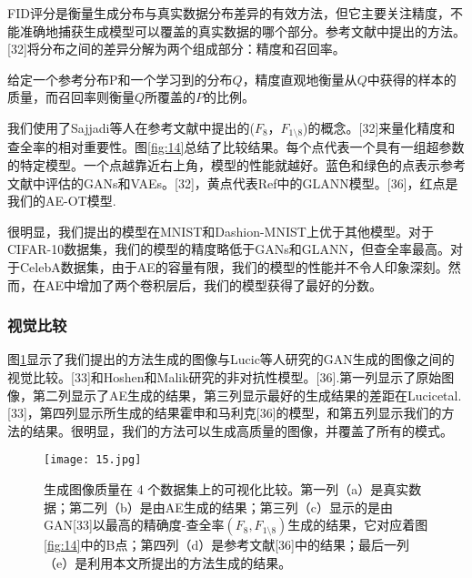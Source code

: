FID评分是衡量生成分布与真实数据分布差异的有效方法，但它主要关注精度，不能准确地捕获生成模型可以覆盖的真实数据的哪个部分。参考文献中提出的方法。[32]将分布之间的差异分解为两个组成部分：精度和召回率。

给定一个参考分布P和一个学习到的分布$Q$，精度直观地衡量从$Q$中获得的样本的质量，而召回率则衡量$Q$所覆盖的$P$的比例。

我们使用了Sajjadi等人在参考文献中提出的($F_8$，$F_{1 \setminus  8}$)的概念。[32]来量化精度和查全率的相对重要性。图\ref{fig:14}总结了比较结果。每个点代表一个具有一组超参数的特定模型。一个点越靠近右上角，模型的性能就越好。蓝色和绿色的点表示参考文献中评估的GANs和VAEs。[32]，黄点代表Ref中的GLANN模型。[36]，红点是我们的AE-OT模型.

很明显，我们提出的模型在MNIST和Dashion-MNIST上优于其他模型。对于CIFAR-10数据集，我们的模型的精度略低于GANs和GLANN，但查全率最高。对于CelebA数据集，由于AE的容量有限，我们的模型的性能并不令人印象深刻。然而，在AE中增加了两个卷积层后，我们的模型获得了最好的分数。

\subsubsection{视觉比较}

图\ref{fig:15}显示了我们提出的方法生成的图像与Lucic等人研究的GAN生成的图像之间的视觉比较。[33]和Hoshen和Malik研究的非对抗性模型。[36].第一列显示了原始图像，第二列显示了AE生成的结果，第三列显示最好的生成结果的差距在Lucicetal.[33]，第四列显示所生成的结果霍申和马利克[36]的模型，和第五列显示我们的方法的结果。很明显，我们的方法可以生成高质量的图像，并覆盖了所有的模式。

\begin{figure}[h]
	\centering
	\texttt{[image: 15.jpg]}
	\caption{生成图像质量在 4 个数据集上的可视化比较。第一列（a）是真实数据；第二列（b）是由AE生成的结果；第三列（c）显示的是由GAN[33]以最高的精确度-查全率$(F_8,F_{1 \setminus 8})$生成的结果，它对应着图\ref{fig:14}中的B点；第四列（d）是参考文献[36]中的结果；最后一列（e）是利用本文所提出的方法生成的结果。}
	\label{fig:15}
\end{figure}